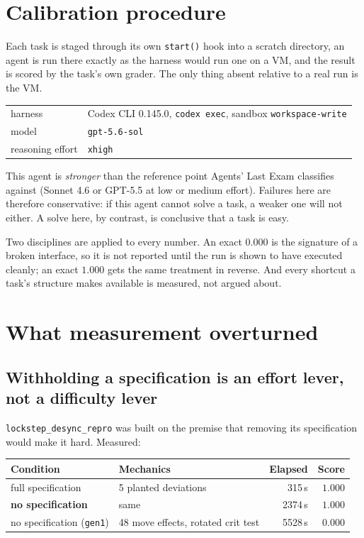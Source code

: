 \documentclass[11pt,a4paper]{article}
\newcommand{\task}[1]{\texttt{#1}}
\begin{document}
\section{Calibration procedure}

Each task is staged through its own \texttt{start()} hook into a scratch directory,
an agent is run there exactly as the harness would run one on a VM, and the result
is scored by the task's own grader. The only thing absent relative to a real run is
the VM.

\begin{center}
\small
\begin{tabular}{@{}ll@{}}
\toprule
harness & Codex CLI 0.145.0, \texttt{codex exec}, sandbox \texttt{workspace-write} \\
model & \texttt{gpt-5.6-sol} \\
reasoning effort & \texttt{xhigh} \\
\bottomrule
\end{tabular}
\end{center}

This agent is \emph{stronger} than the reference point Agents' Last Exam classifies
against (Sonnet 4.6 or GPT-5.5 at low or medium effort). Failures here are therefore
conservative: if this agent cannot solve a task, a weaker one will not either. A
solve here, by contrast, is conclusive that a task is easy.

Two disciplines are applied to every number. An exact $0.000$ is the signature of a
broken interface, so it is not reported until the run is shown to have executed
cleanly; an exact $1.000$ gets the same treatment in reverse. And every shortcut a
task's structure makes available is measured, not argued about.

\section{What measurement overturned}

\subsection{Withholding a specification is an effort lever, not a difficulty lever}
\label{sec:spec}

\task{lockstep\_desync\_repro} was built on the premise that removing its
specification would make it hard. Measured:

\begin{center}
\small
\begin{tabular}{@{}llrr@{}}
\toprule
Condition & Mechanics & Elapsed & Score \\
\midrule
full specification & 5 planted deviations & 315\,s & $1.000$ \\
\textbf{no specification} & same & 2374\,s & $\mathbf{1.000}$ \\
no specification (\task{gen1}) & 48 move effects, rotated crit test & 5528\,s & $\mathbf{0.000}$ \\
\bottomrule
\end{tabular}
\end{center}
\end{document}
